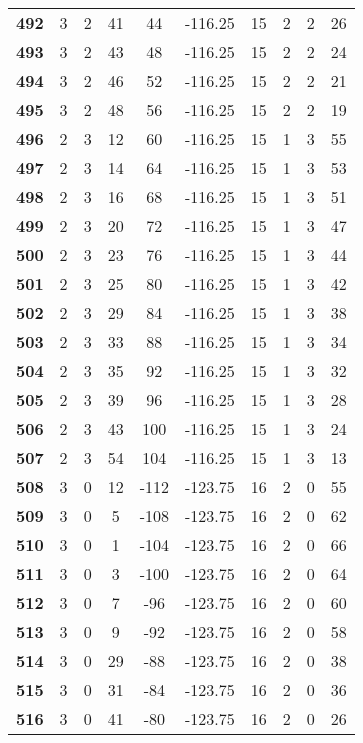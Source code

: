 \documentclass[12pt,letterpaper, onecolumn]{exam}
\begin{document}
\begin{longtable}{cccccccccc}
    \textbf{492} & 3 & 2 & 41 & 44 & -116.25 & 15 & 2 & 2 & 26 \\ 
    \textbf{493} & 3 & 2 & 43 & 48 & -116.25 & 15 & 2 & 2 & 24 \\ 
    \textbf{494} & 3 & 2 & 46 & 52 & -116.25 & 15 & 2 & 2 & 21 \\ 
    \textbf{495} & 3 & 2 & 48 & 56 & -116.25 & 15 & 2 & 2 & 19 \\ 
    \textbf{496} & 2 & 3 & 12 & 60 & -116.25 & 15 & 1 & 3 & 55 \\ 
    \textbf{497} & 2 & 3 & 14 & 64 & -116.25 & 15 & 1 & 3 & 53 \\ 
    \textbf{498} & 2 & 3 & 16 & 68 & -116.25 & 15 & 1 & 3 & 51 \\ 
    \textbf{499} & 2 & 3 & 20 & 72 & -116.25 & 15 & 1 & 3 & 47 \\ 
    \textbf{500} & 2 & 3 & 23 & 76 & -116.25 & 15 & 1 & 3 & 44 \\ 
    \textbf{501} & 2 & 3 & 25 & 80 & -116.25 & 15 & 1 & 3 & 42 \\ 
    \textbf{502} & 2 & 3 & 29 & 84 & -116.25 & 15 & 1 & 3 & 38 \\ 
    \textbf{503} & 2 & 3 & 33 & 88 & -116.25 & 15 & 1 & 3 & 34 \\ 
    \textbf{504} & 2 & 3 & 35 & 92 & -116.25 & 15 & 1 & 3 & 32 \\ 
    \textbf{505} & 2 & 3 & 39 & 96 & -116.25 & 15 & 1 & 3 & 28 \\ 
    \textbf{506} & 2 & 3 & 43 & 100 & -116.25 & 15 & 1 & 3 & 24 \\ 
    \textbf{507} & 2 & 3 & 54 & 104 & -116.25 & 15 & 1 & 3 & 13 \\ 
    \textbf{508} & 3 & 0 & 12 & -112 & -123.75 & 16 & 2 & 0 & 55 \\ 
    \textbf{509} & 3 & 0 & 5 & -108 & -123.75 & 16 & 2 & 0 & 62 \\ 
    \textbf{510} & 3 & 0 & 1 & -104 & -123.75 & 16 & 2 & 0 & 66 \\ 
    \textbf{511} & 3 & 0 & 3 & -100 & -123.75 & 16 & 2 & 0 & 64 \\ 
    \textbf{512} & 3 & 0 & 7 & -96 & -123.75 & 16 & 2 & 0 & 60 \\ 
    \textbf{513} & 3 & 0 & 9 & -92 & -123.75 & 16 & 2 & 0 & 58 \\ 
    \textbf{514} & 3 & 0 & 29 & -88 & -123.75 & 16 & 2 & 0 & 38 \\ 
    \textbf{515} & 3 & 0 & 31 & -84 & -123.75 & 16 & 2 & 0 & 36 \\ 
    \textbf{516} & 3 & 0 & 41 & -80 & -123.75 & 16 & 2 & 0 & 26 \\ 

\end{longtable}
\end{document}
